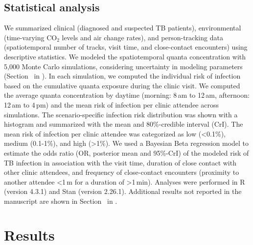 \documentclass[fleqn,11pt]{wlscirep}
\begin{document}
\subsection*{Statistical analysis}

We summarized clinical (diagnosed and suspected TB patients), environmental (time-varying CO$_2$ levels and air change rates), and person-tracking data (spatiotemporal number of tracks, visit time, and close-contact encounters) using descriptive statistics. We modeled the spatiotemporal quanta concentration with 5,000 Monte Carlo simulations, considering uncertainty in modeling parameters (Section~ in \supp). In each simulation, we computed the individual risk of infection based on the cumulative quanta exposure during the clinic visit. We computed the average quanta concentration by daytime (morning: 8\,am to 12\,am, afternoon: 12\,am to 4\,pm) and the mean risk of infection per clinic attendee across simulations. The scenario-specific infection risk distribution was shown with a histogram and summarized with the mean and 80\%-credible interval (CrI). The mean risk of infection per clinic attendee was categorized as low (<0.1\%), medium (0.1-1\%), and high (>1\%). We used a Bayesian Beta regression model to estimate the odds ratio (OR, posterior mean and 95\%-CrI) of the modeled risk of TB infection in association with the visit time, duration of close contact with other clinic attendees, and frequency of close-contact encounters (proximity to another attendee <1\,m for a duration of >1\,min). Analyses were performed in R (version 4.3.1) and Stan (version 2.26.1). Additional results not reported in the manuscript are shown in Section~ in \supp. 

\newpage

\section*{Results}
\end{document}
